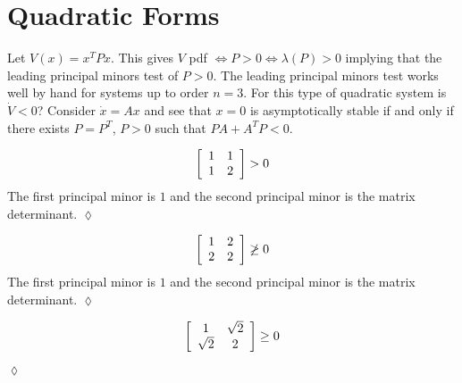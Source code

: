 \mainmatter%
\setcounter{page}{1}

\lectureseries[\course]{\course}

\date{February 2, 2010}

\setaddress%

\setcounter{lecture}{8}
\setcounter{chapter}{8}


\section{Quadratic Forms}
Let $V(x)=x^T Px$.
This gives $V$ pdf $\Leftrightarrow P>0 \Leftrightarrow \lambda(P)>0$ implying that the leading principal minors test of $P>0$.
The leading principal minors test works well by hand for systems up to order $n=3$.
For this type of quadratic system is $\dot{V}<0$? Consider $\dot{x}=Ax$ and see that $x=0$ is asymptotically stable if and only if there exists $P=P^T$, $P>0$ such that $PA+A^T P<0$.

\begin{example}
\begin{align*}
\left[\begin{array}{c c} 1 & 1 \\ 1 & 2 \end{array}\right]>0
\end{align*}
The first principal minor is $1$ and the second principal minor is the matrix determinant.
$\lozenge$
\end{example}

\begin{example}
\begin{align*}
\left[\begin{array}{c c} 1 & 2 \\ 2 & 2 \end{array}\right]\not\geq0
\end{align*}
The first principal minor is $1$ and the second principal minor is the matrix determinant.
$\lozenge$
\end{example}

\begin{example}
\begin{align*}
\left[\begin{array}{c c} 1 & \sqrt{2} \\ \sqrt{2} & 2 \end{array}\right]\geq0
\end{align*}
$\lozenge$
\end{example}

